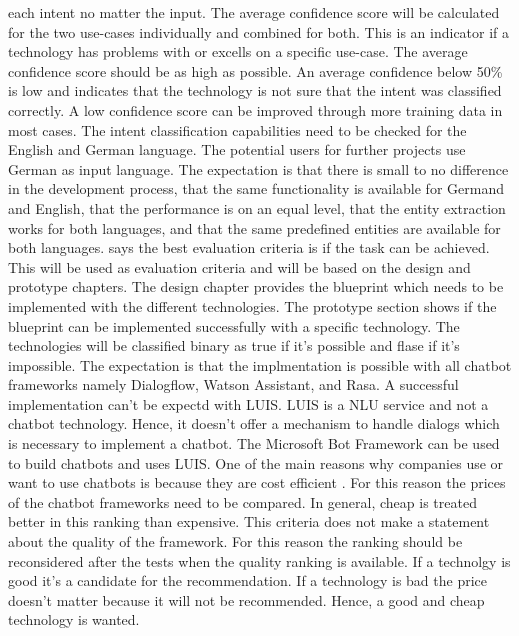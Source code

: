 each intent no matter the input.
The average confidence score will be calculated for the 
two use-cases individually and combined for both.
This is an indicator if a technology has problems with or excells
on a specific use-case.
The average confidence score should be as high as possible.
An average confidence below 50\% is low and indicates 
that the technology is not sure that the intent was 
classified correctly.
A low confidence score can be improved through more training data
in most cases. 
The intent classification capabilities need to be checked for the English and German 
language.
The potential users for further projects use German as input language.
The expectation is that there is small to no difference in the development process, 
that the same functionality is available for Germand and English,
that the performance is on an equal level, that the 
entity extraction works for both languages, and that 
the same predefined entities are available for both languages.
\citet{singhbuilding} says the best evaluation criteria is if the 
task can be achieved.
This will be used as evaluation criteria and will be based on the 
design and prototype chapters.
The design chapter provides the blueprint which needs to be 
implemented with the different technologies.
The prototype section shows if the blueprint can be 
implemented successfully with a specific technology.
The technologies will be classified binary as true if it's possible and 
flase if it's impossible.
The expectation is that the implmentation is possible with 
all chatbot frameworks namely Dialogflow, Watson Assistant, and Rasa.
A successful implementation can't be expectd with LUIS.
LUIS is a NLU service and not a chatbot technology.
Hence, it doesn't offer a mechanism to handle dialogs which is 
necessary to implement a chatbot.
The Microsoft Bot Framework can be used to build chatbots 
and uses LUIS.
One of the main reasons why companies use or want to use chatbots is because they are cost efficient \citet{buiildChatbotsPython}.
For this reason the prices of the chatbot frameworks need to be compared.
In general, cheap is treated better in this ranking than expensive.
This criteria does not make a statement about the quality of the framework.
For this reason the ranking should be reconsidered after the tests when the 
quality ranking is available.
If a technolgy is good it's a candidate for the recommendation.
If a technology is bad the price doesn't matter because it will not be recommended.
Hence, a good and cheap technology is wanted. 
